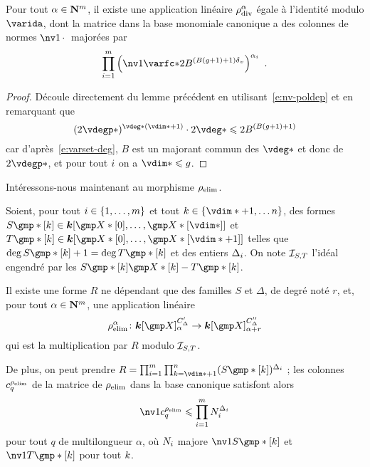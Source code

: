 \begin{coro} \label{c:hmat-rdiv}
  Pour tout \( \alpha \in {\mathbf{N}}^m \), il existe une application linéaire \(
    \rho\sb{\mathrm{div }}^\alpha \) égale à l'identité modulo \( \varida \), dont la matrice
  dans la base monomiale canonique a des colonnes de normes \( \nv1\truc \)
  majorées par
  \begin{equation}
    \prod\fctrange \left(
    \nv1{ \varfc* }
    2 B^{(B(\genre+1) + 1)\dv}
  \right) ^{ \alpha_\fct }
  \pmm.
  \end{equation}
\end{coro}

\begin{proof}
  Découle directement du lemme précédent en utilisant~\eqref{e:nv-poldep} et
  en remarquant que
  \begin{equation}
    ( 2 \vdegp* )^{\vdeg* (\vdim* + 1)} \cdot 2 \vdeg*
    \le
    2 B^{(B(\genre+1) + 1)}
  \end{equation}
  car d'après~\eqref{e:varset-deg}, \( B \) est un majorant commun des \(
    \vdeg* \) et donc de \( 2\vdegp* \), et pour tout \( i \) on a \(
    \vdim* \le \genre \).
\end{proof}

Intéressons-nous maintenant au morphisme \( \rho\sb{\mathrm{elim}} \).

\begin{lem}
  Soient, pour tout \( i \in \{ 1, \dots, m \} \) et tout \( \ind \in
  \{ \vdim* + 1, \dots \dimp \} \), des formes
  \( S\mexp*[\ind] \in \cdn [ \vmp*[0], \dots, \vmp*[\vdim*] ] \) et
  \( T\mexp*[\ind] \in \cdn [ \vmp*[0], \dots, \vmp*[\vdim*+1] ] \)
  telles que \( \deg S\mexp*[\ind] + 1 = \deg T\mexp*[\ind] \) et des entiers
  \( \Delta_i \). On note \( \mathcal I_{S, T} \) l'idéal engendré par les
  \( S\mexp*[\ind] \vmp*[\ind] - T\mexp*[\ind] \).

  Il existe une forme \( R \) ne dépendant que des familles \( S \) et \(
    \Delta \), de degré noté \( r \), et, pour tout \( \alpha \in {\mathbf{N}}^m \),
  une application linéaire
  \begin{equation}
    \relim^\alpha \colon
    \cdn [\vmp]_ {\alpha}^{C'_\Delta}
    \to
    \cdn [\vmp]_ {\alpha+r}^{C''_\Delta}
  \end{equation}
  qui est la multiplication par \( R \) modulo \( \mathcal I_{S, T} \).

  De plus, on peut prendre
  \( R = \prod\fctrange \prod_{\ind = \vdim*+1}^{\dimp}
    ( S\mexp*[\ind] )^{\Delta_\fct} \) ; les colonnes \( c_q^{\rho\sb{\mathrm{elim}}} \) de la
  matrice de \( \rho\sb{\mathrm{elim}} \) dans la base canonique satisfont alors
  \begin{equation}
    \nv1{ c_q^{\relim} }
    \le
    \prod\fctrange N_\fct^{\Delta_\fct}
  \end{equation}
  pour tout \( q \) de multilongueur \( \alpha \), où \( N_i \) majore
  \( \nv1{ S\mexp*[\ind] } \) et \( \nv1{ T\mexp*[\ind] } \) pour tout
  \( k \).
\end{lem}

